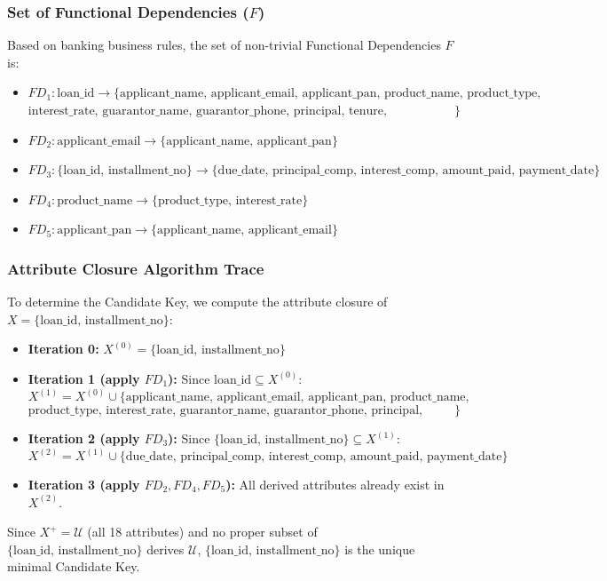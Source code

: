 \documentclass[11pt,a4paper]{report}
\begin{document}
\subsubsection{Set of Functional Dependencies ($F$)}
Based on banking business rules, the set of non-trivial Functional Dependencies $F$ is:
\begin{itemize}
    \item $FD_1: \text{loan\_id} \rightarrow \{\text{applicant\_name, applicant\_email, applicant\_pan, product\_name, product\_type,}$ $\text{interest\_rate, guarantor\_name, guarantor\_phone, principal, tenure, emi\_amount}\}$
    \item $FD_2: \text{applicant\_email} \rightarrow \{\text{applicant\_name, applicant\_pan}\}$
    \item $FD_3: \{\text{loan\_id, installment\_no}\} \rightarrow \{\text{due\_date, principal\_comp, interest\_comp, amount\_paid, payment\_date}\}$
    \item $FD_4: \text{product\_name} \rightarrow \{\text{product\_type, interest\_rate}\}$
    \item $FD_5: \text{applicant\_pan} \rightarrow \{\text{applicant\_name, applicant\_email}\}$
\end{itemize}

\subsubsection{Attribute Closure Algorithm Trace}
To determine the Candidate Key, we compute the attribute closure of $X = \{\text{loan\_id, installment\_no}\}$:
\begin{itemize}
    \item \textbf{Iteration 0:} $X^{(0)} = \{\text{loan\_id, installment\_no}\}$
    \item \textbf{Iteration 1 (apply $FD_1$):} Since $\text{loan\_id} \subseteq X^{(0)}$:
    $$X^{(1)} = X^{(0)} \cup \{\text{applicant\_name, applicant\_email, applicant\_pan, product\_name,}$$
    $$\text{product\_type, interest\_rate, guarantor\_name, guarantor\_phone, principal, tenure, emi\_amount}\}$$
    \item \textbf{Iteration 2 (apply $FD_3$):} Since $\{\text{loan\_id, installment\_no}\} \subseteq X^{(1)}$:
    $$X^{(2)} = X^{(1)} \cup \{\text{due\_date, principal\_comp, interest\_comp, amount\_paid, payment\_date}\}$$
    \item \textbf{Iteration 3 (apply $FD_2, FD_4, FD_5$):} All derived attributes already exist in $X^{(2)}$.
\end{itemize}
Since $X^+ = \mathcal{U}$ (all 18 attributes) and no proper subset of $\{\text{loan\_id, installment\_no}\}$ derives $\mathcal{U}$, $\{\text{loan\_id, installment\_no}\}$ is the unique minimal Candidate Key.
\end{document}
